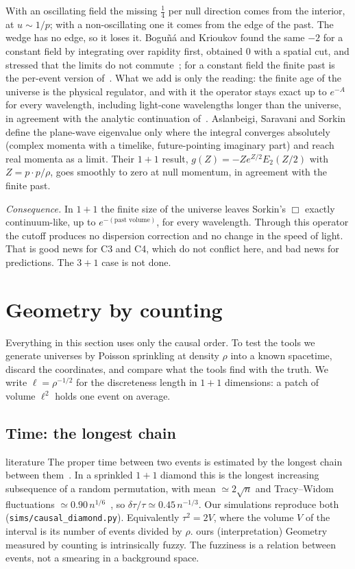 \documentclass[11pt,a4paper]{article}
\newcommand{\tagbox}[2]{\textsf{\scriptsize\colorbox{#1!12}{\textcolor{#1!70!black}{#2}}}}
\newcommand{\lit}{\tagbox{blue}{literature}}
\newcommand{\ours}{\tagbox{orange}{ours}}
\begin{document}
With an oscillating field the missing $\tfrac14$ per null direction comes from the interior, at $u\sim1/p$; with a non-oscillating one it comes from the edge of the past. The wedge has no edge, so it loses it. Bogu\~n\'a and Krioukov found the same $-2$ for a constant field by integrating over rapidity first, obtained $0$ with a spatial cut, and stressed that the limits do not commute~\cite{BK25}; for a constant field the finite past is the per-event version of~\cite{BDJS15}. What we add is only the reading: the finite age of the universe is the physical regulator, and with it the operator stays exact up to $e^{-A}$ for every wavelength, including light-cone wavelengths longer than the universe, in agreement with the analytic continuation of~\cite{ASS14}. Aslanbeigi, Saravani and Sorkin~\cite{ASS14} define the plane-wave eigenvalue only where the integral converges absolutely (complex momenta with a timelike, future-pointing imaginary part) and reach real momenta as a limit. Their $1+1$ result, $g(Z)=-Ze^{Z/2}E_2(Z/2)$ with $Z=p\cdot p/\rho$, goes smoothly to zero at null momentum, in agreement with the finite past.

\emph{Consequence.} In $1+1$ the finite size of the universe leaves Sorkin's $\Box$ exactly continuum-like, up to $e^{-(\text{past volume})}$, for every wavelength. Through this operator the cutoff produces no dispersion correction and no change in the speed of light. That is good news for C3 and C4, which do not conflict here, and bad news for predictions. The $3+1$ case is not done.

\section{Geometry by counting}\label{sec:toolkit}
Everything in this section uses only the causal order. To test the tools we generate universes by Poisson sprinkling at density $\rho$ into a known spacetime, discard the coordinates, and compare what the tools find with the truth. We write $\ell=\rho^{-1/2}$ for the discreteness length in $1+1$ dimensions: a patch of volume $\ell^2$ holds one event on average.

\subsection{Time: the longest chain}
\lit{} The proper time between two events is estimated by the longest chain between them~\cite{BrightwellGregory91}. In a sprinkled $1+1$ diamond this is the longest increasing subsequence of a random permutation, with mean $\simeq2\sqrt n$ and Tracy--Widom fluctuations $\simeq0.90\,n^{1/6}$~\cite{BDJ99}, so $\delta\tau/\tau\simeq0.45\,n^{-1/3}$. Our simulations reproduce both (\texttt{sims/causal\_diamond.py}). Equivalently $\tau^2=2V$, where the volume $V$ of the interval is its number of events divided by $\rho$. \ours{} (interpretation) Geometry measured by counting is intrinsically fuzzy. The fuzziness is a relation between events, not a smearing in a background space.
\end{document}
